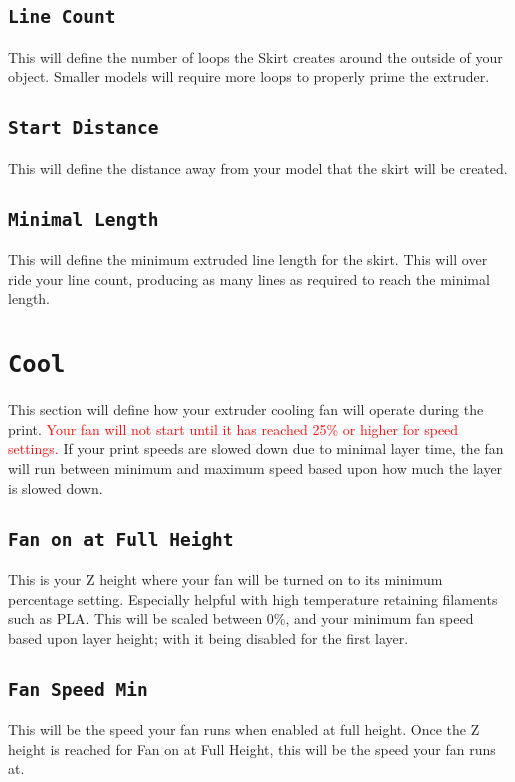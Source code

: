 \subsection{\texttt{Line Count}}
This will define the number of loops the Skirt creates around the outside of your object. Smaller models will require more loops to properly prime the extruder.

\subsection{\texttt{Start Distance}}
This will define the distance away from your model that the skirt will be created. 

\subsection{\texttt{Minimal Length}}
This will define the minimum extruded line length for the skirt. This will over ride your line count, producing as many lines as required to reach the minimal length.

\section{\texttt{Cool}}
This section will define how your extruder cooling fan will operate during the print. \textcolor{red}{Your fan will not start until it has reached 25\% or higher for speed settings.} If your print speeds are slowed down due to minimal layer time, the fan will run between minimum and maximum speed based upon how much the layer is slowed down.

\subsection{\texttt{Fan on at Full Height}}
This is your Z height where your fan will be turned on to its minimum percentage setting. Especially helpful with high temperature retaining filaments such as PLA. This will be scaled between 0\%, and your minimum fan speed based upon layer height; with it being disabled for the first layer.

\subsection{\texttt{Fan Speed Min}}

This will be the speed your fan runs when enabled at full height. Once the Z height is reached for Fan on at Full Height, this will be the speed your fan runs at.

